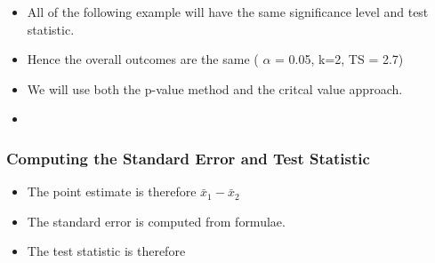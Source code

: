﻿\documentclass[a4]{beamer}
\begin{document}
\begin{frame}
\large
\begin{itemize}
\item All of the following example will have the same significance level and test statistic.
\item Hence the overall outcomes are the same ( $\alpha$ = 0.05, k=2, TS = 2.7)
\item We will use both the p-value method and the critcal value approach.
\item 
\end{itemize}
\end{frame}


\begin{frame}
\frametitle{Computing the Standard Error and Test Statistic }
\begin{itemize}
\item The point estimate is therefore $\bar{x}_1 -\bar{x}_2$
\item The standard error is computed from formulae.
\item The test statistic is therefore 
\end{itemize}
\end{frame}

\end{document}
